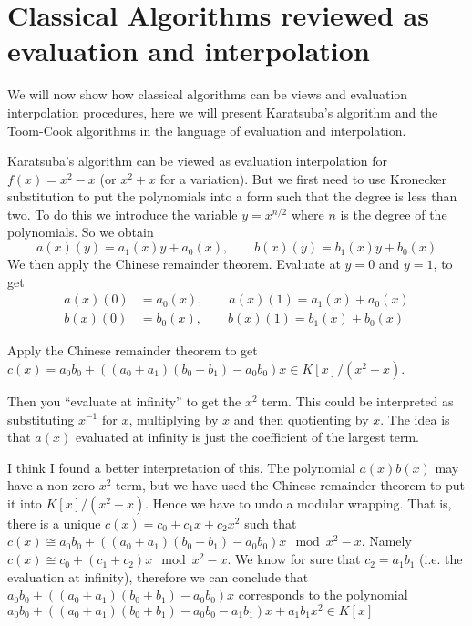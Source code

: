 \section{Classical Algorithms reviewed as evaluation and interpolation}%
\label{sec:classical_algorithms_reviewed_as_evaluation_and_interpolation}

We will now show how classical algorithms can be views and evaluation interpolation procedures, here we will present Karatsuba's algorithm and the Toom-Cook algorithms in the language of evaluation and interpolation.

Karatsuba's algorithm can be viewed as evaluation interpolation for $f(x) = x^2 - x$ (or $x^2 + x$ for a variation). But we first need to use Kronecker substitution to put the polynomials into a form such that the degree is less than two. To do this we introduce the variable $y = x^{n/2}$ where $n$ is the degree of the polynomials. So we obtain
\[
    a(x)(y) = a_1(x)y + a_0(x), \qquad b(x)(y) = b_1(x)y + b_0(x)
\]
We then apply the Chinese remainder theorem. Evaluate at $y = 0$ and $y = 1$, to get
\begin{align*}
    a(x)(0) &= a_0(x), \qquad a(x)(1) = a_1(x) + a_0(x)\\
    b(x)(0) &= b_0(x), \qquad b(x)(1) = b_1(x) + b_0(x)
\end{align*}

Apply the Chinese remainder theorem to get $c(x) = a_0b_0 + ((a_0 + a_1)(b_0 + b_1) - a_0b_0)x \in K[x]/(x^2 - x)$. 

Then you ``evaluate at infinity'' to get the $x^2$ term. This could be interpreted as substituting $x^{-1}$ for $x$, multiplying by $x$ and then quotienting by $x$. The idea is that $a(x)$ evaluated at infinity is just the coefficient of the largest term. 

I think I found a better interpretation of this. The polynomial $a(x)b(x)$ may have a non-zero $x^2$ term, but we have used the Chinese remainder theorem to put it into $K[x] / (x^2 - x)$. Hence we have to undo a modular wrapping. That is, there is a unique $c(x) = c_0 + c_1x + c_2x^2$ such that $c(x) \cong a_0b_0 + ((a_0 + a_1)(b_0 + b_1) - a_0b_0)x \mod x^2 - x$. Namely $c(x) \cong c_0 + (c_1 + c_2)x \mod x^2 - x$. We know for sure that $c_2 = a_1b_1$ (i.e. the evaluation at infinity), therefore we can conclude that $a_0b_0 + ((a_0 + a_1)(b_0 + b_1) - a_0b_0)x$ corresponds to the polynomial $a_0b_0 + ((a_0 + a_1)(b_0 + b_1) - a_0b_0 - a_1b_1)x + a_1b_1x^2 \in K[x]$


